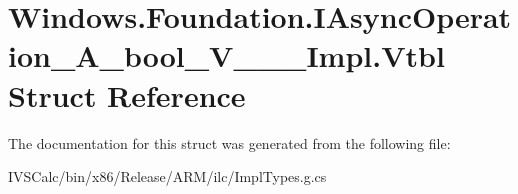 \hypertarget{struct_windows_1_1_foundation_1_1_i_async_operation___a__bool___v_______impl_1_1_vtbl}{}\section{Windows.\+Foundation.\+I\+Async\+Operation\+\_\+\+A\+\_\+bool\+\_\+\+V\+\_\+\+\_\+\+\_\+\+Impl.\+Vtbl Struct Reference}
\label{struct_windows_1_1_foundation_1_1_i_async_operation___a__bool___v_______impl_1_1_vtbl}


The documentation for this struct was generated from the following file\+:\begin{DoxyCompactItemize}
\item 
I\+V\+S\+Calc/bin/x86/\+Release/\+A\+R\+M/ilc/Impl\+Types.\+g.\+cs\end{DoxyCompactItemize}
